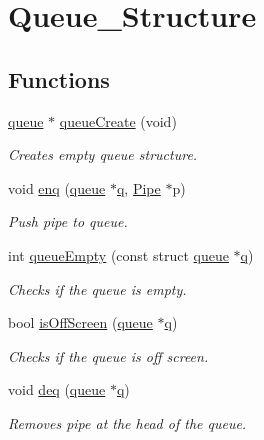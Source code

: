 \hypertarget{group___queue___structure}{}\section{Queue\+\_\+\+Structure}
\label{group___queue___structure}
\subsection*{Functions}
\begin{DoxyCompactItemize}
\item 
\hyperlink{structqueue}{queue} $\ast$ \hyperlink{group___queue___structure_gae93a1da4d92342fc6237dcfaf4d034a2}{queue\+Create} (void)
\begin{DoxyCompactList}\small\item\em Creates empty queue structure. \end{DoxyCompactList}\item 
void \hyperlink{group___queue___structure_ga89512be15c27bb4def10b3e6dff1d240}{enq} (\hyperlink{structqueue}{queue} $\ast$\hyperlink{structqueue}{q}, \hyperlink{struct_pipe}{Pipe} $\ast$p)
\begin{DoxyCompactList}\small\item\em Push pipe to queue. \end{DoxyCompactList}\item 
int \hyperlink{group___queue___structure_gaceddff2dc3ce07ad02a362bee362afb8}{queue\+Empty} (const struct \hyperlink{structqueue}{queue} $\ast$\hyperlink{structqueue}{q})
\begin{DoxyCompactList}\small\item\em Checks if the queue is empty. \end{DoxyCompactList}\item 
bool \hyperlink{group___queue___structure_ga9156a87b52e80132d4458a46fdfa0083}{is\+Off\+Screen} (\hyperlink{structqueue}{queue} $\ast$\hyperlink{structqueue}{q})
\begin{DoxyCompactList}\small\item\em Checks if the queue is off screen. \end{DoxyCompactList}\item 
void \hyperlink{group___queue___structure_ga096d562d71d667b63d6dfedb74cd2729}{deq} (\hyperlink{structqueue}{queue} $\ast$\hyperlink{structqueue}{q})
\begin{DoxyCompactList}\small\item\em Removes pipe at the head of the queue. \end{DoxyCompactList}\item 

\end{DoxyCompactItemize}
